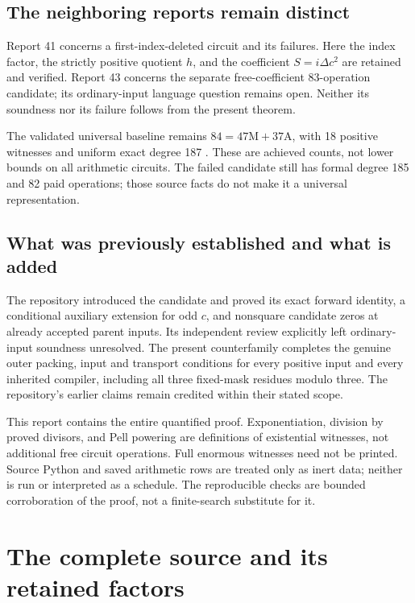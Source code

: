 \documentclass[11pt,letterpaper]{article}
\theoremstyle{definition}\newtheorem{definition}[theorem]{Definition}
\theoremstyle{remark}\newtheorem{remark}[theorem]{Remark}
\newcommand{\D}{\Delta}
\begin{document}
\subsection{The neighboring reports remain distinct}
Report 41 concerns a first-index-deleted circuit and its failures.
Here the index factor, the strictly positive quotient $h$, and the
coefficient $S=i\D c^2$ are retained and verified. Report 43 concerns
the separate free-coefficient 83-operation candidate; its ordinary-input
language question remains open. Neither its soundness nor its failure
follows from the present theorem.

The validated universal baseline remains
$84=47\mathrm M+37\mathrm A$, with 18 positive witnesses and uniform
exact degree 187 \cite{fup:sp:baseline}. These are achieved counts, not lower
bounds on all arithmetic circuits. The failed candidate still has
formal degree 185 and 82 paid operations; those source facts do not make
it a universal representation.

\subsection{What was previously established and what is added}
The repository introduced the candidate and proved its exact forward
identity, a conditional auxiliary extension for odd $c$, and nonsquare
candidate zeros at already accepted parent inputs. Its independent
review explicitly left ordinary-input soundness unresolved. The present
counterfamily completes the genuine outer packing, input and transport
conditions for every positive input and every inherited compiler,
including all three fixed-mask residues modulo three. The repository's
earlier claims remain credited within their stated scope.

This report contains the entire quantified proof. Exponentiation,
division by proved divisors, and Pell powering are definitions of
existential witnesses, not additional free circuit operations. Full
enormous witnesses need not be printed. Source Python and saved
arithmetic rows are treated only as inert data; neither is run or
interpreted as a schedule. The reproducible checks are bounded
corroboration of the proof, not a finite-search substitute for it.

\section{The complete source and its retained factors}
\label{fup:sp:sec:source}
\end{document}
